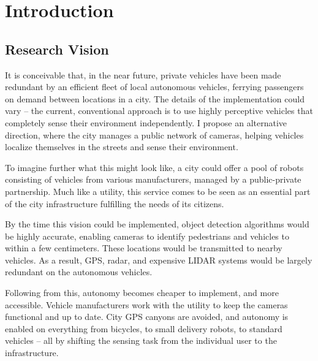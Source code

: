 \documentclass[a4paper,12pt,twoside,openright]{report}
\begin{document}
\pagestyle{empty}
\singlespacing

\onehalfspacing

\singlespacing


\setcounter{page}{0}
\pagestyle{plain}
\tableofcontents
\listoffigures
\listoftables

\onehalfspacing


\chapter{Introduction}
\setcounter{page}{1} 

\section{Research Vision}

It is conceivable that, in the near future, private vehicles have been made redundant by an efficient
fleet of local autonomous vehicles, ferrying passengers on demand between locations in 
a city. The details of the implementation could vary -- the current, conventional
approach is to use highly perceptive vehicles that completely sense their environment independently.
I propose an alternative direction, where the city manages a public network of
cameras, helping vehicles localize themselves in the streets and sense their environment.

To imagine further what this might look like, a city could offer a pool of robots
consisting of vehicles from various manufacturers, managed by a public-private partnership. 
Much like a utility, this service comes to be seen as an essential 
part of the city infrastructure fulfilling the needs of its citizens.

By the time this vision could be implemented, object detection algorithms would be
highly accurate, enabling cameras to identify pedestrians and vehicles to within a few centimeters. 
These locations would be transmitted to nearby vehicles. As a result, GPS, radar, and expensive LIDAR systems
would be largely redundant on the autonomous vehicles.

Following from this, autonomy becomes cheaper to implement,
and more accessible. Vehicle manufacturers work with the utility to keep the cameras 
functional and up to date. City GPS canyons are avoided, and autonomy is enabled 
on everything from bicycles, to small delivery robots, to standard vehicles -- all by 
shifting the sensing task from the individual user to the infrastructure.
\end{document}
